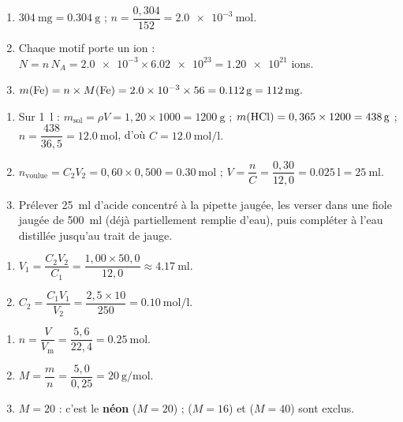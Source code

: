 \documentclass[11pt,a4paper]{article}
\begin{document}
\begin{corrige}
\begin{enumerate}[label=\alph*)]
  \item $\qty{304}{\milli\gram}=\qty{0.304}{\gram}$ ; $n=\dfrac{0,304}{152}=\qty{2.0e-3}{\mole}.$
  \item Chaque motif  porte un ion  : $N=n\,N_A=\num{2.0e-3}\times\num{6.02e23}=\num{1.20e21}$ ions.
  \item $m(\ce{Fe})=n\times M(\ce{Fe})=\num{2.0e-3}\times56=\qty{0.112}{\gram}=\qty{112}{\milli\gram}.$
\end{enumerate}
\end{corrige}

\begin{corrige}
\begin{enumerate}[label=\alph*)]
  \item Sur \qty{1}{\litre} : $m_{\text{sol}}=\rho V=1,20\times1000=\qty{1200}{\gram}$ ;
        $m(\ce{HCl})=0,365\times1200=\qty{438}{\gram}$ ;
        $n=\dfrac{438}{36,5}=\qty{12.0}{\mole}$, d'où $C=\qty{12.0}{\mole\per\litre}.$
  \item $n_{\text{voulue}}=C_2V_2=0,60\times0,500=\qty{0.30}{\mole}$ ;
        $V=\dfrac{n}{C}=\dfrac{0,30}{12,0}=\qty{0.025}{\litre}=\qty{25}{\milli\litre}.$
  \item Prélever \qty{25}{\milli\litre} d'acide concentré à la pipette jaugée, les verser dans une
        fiole jaugée de \qty{500}{\milli\litre} (déjà partiellement remplie d'eau), puis compléter à
        l'eau distillée jusqu'au trait de jauge.
\end{enumerate}
\end{corrige}

\begin{corrige}[dilutions]
\begin{enumerate}[label=\alph*)]
  \item $V_1=\dfrac{C_2V_2}{C_1}=\dfrac{1,00\times50,0}{12,0}\approx\qty{4.17}{\milli\litre}.$
  \item $C_2=\dfrac{C_1V_1}{V_2}=\dfrac{2,5\times10}{250}=\qty{0.10}{\mole\per\litre}.$
\end{enumerate}
\end{corrige}

\begin{corrige}
\begin{enumerate}[label=\alph*)]
  \item $n=\dfrac{V}{V_{\mathrm{m}}}=\dfrac{5,6}{22,4}=\qty{0.25}{\mole}.$
  \item $M=\dfrac{m}{n}=\dfrac{5,0}{0,25}=\qty{20}{\gram\per\mole}.$
  \item $M=20$ : c'est le \textbf{néon } ($M=20$) ;  ($M=16$) et  ($M=40$) sont exclus.
\end{enumerate}
\end{corrige}
\end{document}

